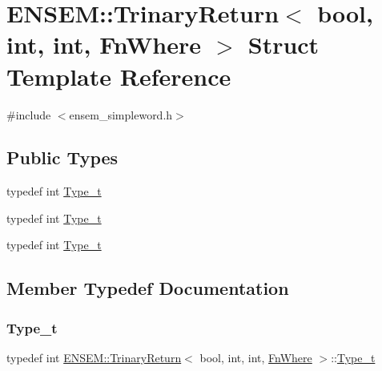 \hypertarget{structENSEM_1_1TrinaryReturn_3_01bool_00_01int_00_01int_00_01FnWhere_01_4}{}\section{E\+N\+S\+EM\+:\+:Trinary\+Return$<$ bool, int, int, Fn\+Where $>$ Struct Template Reference}
\label{structENSEM_1_1TrinaryReturn_3_01bool_00_01int_00_01int_00_01FnWhere_01_4}


{\ttfamily \#include $<$ensem\+\_\+simpleword.\+h$>$}

\subsection*{Public Types}
\begin{DoxyCompactItemize}
\item 
typedef int \mbox{\hyperlink{structENSEM_1_1TrinaryReturn_3_01bool_00_01int_00_01int_00_01FnWhere_01_4_a903989cc198f060fec5777b5c3b18657}{Type\+\_\+t}}
\item 
typedef int \mbox{\hyperlink{structENSEM_1_1TrinaryReturn_3_01bool_00_01int_00_01int_00_01FnWhere_01_4_a903989cc198f060fec5777b5c3b18657}{Type\+\_\+t}}
\item 
typedef int \mbox{\hyperlink{structENSEM_1_1TrinaryReturn_3_01bool_00_01int_00_01int_00_01FnWhere_01_4_a903989cc198f060fec5777b5c3b18657}{Type\+\_\+t}}
\end{DoxyCompactItemize}


\subsection{Member Typedef Documentation}
\mbox{\label{structENSEM_1_1TrinaryReturn_3_01bool_00_01int_00_01int_00_01FnWhere_01_4_a903989cc198f060fec5777b5c3b18657}} 
\subsubsection{\texorpdfstring{Type\_t}{Type\_t}\hspace{0.1cm}{\footnotesize\ttfamily [1/3]}}
{\footnotesize\ttfamily typedef int \mbox{\hyperlink{structENSEM_1_1TrinaryReturn}{E\+N\+S\+E\+M\+::\+Trinary\+Return}}$<$ bool, int, int, \mbox{\hyperlink{structENSEM_1_1FnWhere}{Fn\+Where}} $>$\+::\mbox{\hyperlink{structENSEM_1_1TrinaryReturn_3_01bool_00_01int_00_01int_00_01FnWhere_01_4_a903989cc198f060fec5777b5c3b18657}{Type\+\_\+t}}}

